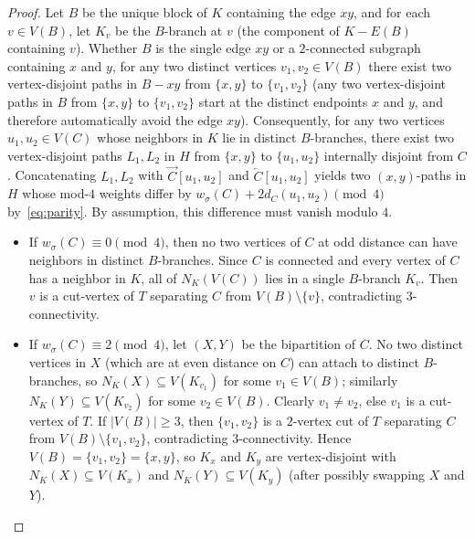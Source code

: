 \documentclass[10pt,letterpaper]{article}
\theoremstyle{zetaplain}
\theoremstyle{zetadef}
\theoremstyle{remark}
\numberwithin{equation}{section}
\newcommand{\vecC}[1]{\overrightarrow{#1}}
\newcommand{\revC}[1]{\overleftarrow{#1}}
\begin{document}
\begin{proof}
Let $B$ be the unique block of $K$ containing the edge $xy$, and for each $v \in V(B)$, let $K_v$ be the $B$-branch at $v$ (the component of $K - E(B)$ containing $v$). Whether $B$ is the single edge $xy$ or a $2$-connected subgraph containing $x$ and $y$, for any two distinct vertices $v_1, v_2 \in V(B)$ there exist two vertex-disjoint paths in $B - xy$ from $\{x, y\}$ to $\{v_1, v_2\}$ (any two vertex-disjoint paths in $B$ from $\{x, y\}$ to $\{v_1, v_2\}$ start at the distinct endpoints $x$ and $y$, and therefore automatically avoid the edge $xy$). Consequently, for any two vertices $u_1, u_2 \in V(C)$ whose neighbors in $K$ lie in distinct $B$-branches, there exist two vertex-disjoint paths $L_1, L_2$ in $H$ from $\{x, y\}$ to $\{u_1, u_2\}$ internally disjoint from $C$. Concatenating $L_1, L_2$ with $\vecC{C}[u_1, u_2]$ and $\revC{C}[u_1, u_2]$ yields two $(x, y)$-paths in $H$ whose mod-$4$ weights differ by $w_\sigma(C) + 2d_C(u_1, u_2) \pmod 4$ by~\eqref{eq:parity}. By assumption, this difference must vanish modulo $4$.
\begin{itemize}
  \item If $w_\sigma(C) \equiv 0 \pmod 4$, then no two vertices of $C$ at odd distance can have neighbors in distinct $B$-branches. Since $C$ is connected and every vertex of $C$ has a neighbor in $K$, all of $N_K(V(C))$ lies in a single $B$-branch $K_v$. Then $v$ is a cut-vertex of $T$ separating $C$ from $V(B) \setminus \{v\}$, contradicting $3$-connectivity.
  \item If $w_\sigma(C) \equiv 2 \pmod 4$, let $(X, Y)$ be the bipartition of $C$. No two distinct vertices in $X$ (which are at even distance on $C$) can attach to distinct $B$-branches, so $N_K(X) \subseteq V(K_{v_1})$ for some $v_1 \in V(B)$; similarly $N_K(Y) \subseteq V(K_{v_2})$ for some $v_2 \in V(B)$. Clearly $v_1 \ne v_2$, else $v_1$ is a cut-vertex of $T$. If $|V(B)| \ge 3$, then $\{v_1, v_2\}$ is a $2$-vertex cut of $T$ separating $C$ from $V(B) \setminus \{v_1, v_2\}$, contradicting $3$-connectivity. Hence $V(B) = \{v_1, v_2\} = \{x, y\}$, so $K_x$ and $K_y$ are vertex-disjoint with $N_K(X) \subseteq V(K_x)$ and $N_K(Y) \subseteq V(K_y)$ (after possibly swapping $X$ and $Y$).


\end{itemize}
\end{proof}
\end{document}

